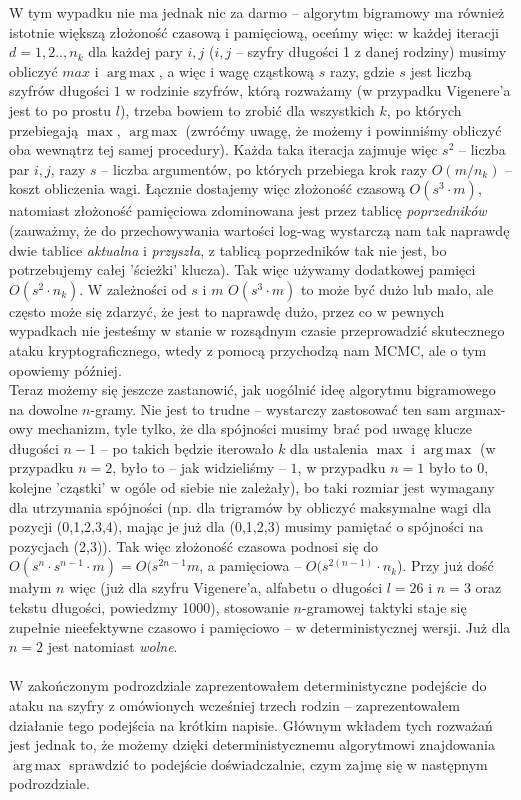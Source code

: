\documentclass[a4paper]{article}
\DeclareMathOperator*{\argmax}{arg\,max}
\begin{document}
W tym wypadku nie ma jednak nic za darmo – algorytm bigramowy ma również istotnie większą złożoność czasową i pamięciową, oceńmy więc: w każdej iteracji $d=1,2.., n_k$ dla każdej pary $i,j$ ($i,j$ – szyfry długości 1 z danej rodziny) musimy obliczyć $max$ i $\argmax$, a więc i wagę cząstkową $s$ razy, gdzie $s$ jest liczbą szyfrów długości $1$ w  rodzinie szyfrów, którą rozważamy (w przypadku Vigenere'a jest to po prostu $l$), trzeba bowiem to zrobić dla wszystkich $k$, po których przebiegają $\max$, $\argmax$ (zwróćmy uwagę, że możemy i powinniśmy obliczyć oba wewnątrz tej samej procedury). Każda taka iteracja zajmuje więc $s^2$ – liczba par $i,j$, razy $s$ – liczba argumentów, po których przebiega krok razy $O(m/n_k)$ – koszt obliczenia wagi. Łącznie dostajemy więc złożoność czasową $O(s^3 \cdot m)$, natomiast złożoność pamięciowa zdominowana jest przez tablicę \textit{poprzedników} (zauważmy, że do przechowywania wartości log-wag wystarczą nam tak naprawdę dwie tablice \textit{aktualna} i \textit{przyszła}, z tablicą poprzedników tak nie jest, bo potrzebujemy całej 'ścieżki' klucza). Tak więc używamy dodatkowej pamięci $O(s^2 \cdot n_k)$. W zależności od $s$ i $m$ $O(s^3 \cdot m)$ to może być dużo lub mało, ale często może się zdarzyć, że jest to naprawdę dużo, przez co w pewnych wypadkach nie jesteśmy w stanie w rozsądnym czasie przeprowadzić skutecznego ataku kryptograficznego, wtedy z pomocą przychodzą nam MCMC, ale o tym opowiemy później.\\
Teraz możemy się jeszcze zastanowić, jak uogólnić ideę algorytmu bigramowego na dowolne $n$-gramy. Nie jest to trudne – wystarczy zastosować ten sam argmax-owy mechanizm, tyle tylko, że dla spójności musimy brać pod uwagę klucze długości $n-1$ – po takich będzie iterowało $k$ dla ustalenia $\max$ i $\argmax$ (w przypadku $n=2$, było to – jak widzieliśmy – $1$, w przypadku $n=1$ było to $0$, kolejne 'cząstki' w ogóle od siebie nie zależały), bo taki rozmiar jest wymagany dla utrzymania spójności (np. dla trigramów by obliczyć maksymalne wagi dla pozycji (0,1,2,3,4), mając je już dla (0,1,2,3) musimy pamiętać o spójności na pozycjach (2,3)). Tak więc złożoność czasowa podnosi się do $O(s^n \cdot s^{n-1} \cdot m) = O(s^{2n-1}m$, a pamięciowa – $O(s^{2(n-1)} \cdot n_k$). Przy już dość małym $n$ więc (już dla szyfru Vigenere'a, alfabetu o długości $l=26$ i $n=3$ oraz tekstu długości, powiedzmy 1000), stosowanie $n$-gramowej taktyki staje się zupełnie nieefektywne czasowo i pamięciowo – w deterministycznej wersji. Już dla $n=2$ jest natomiast \textit{wolne}.\\\\
W zakończonym podrozdziale zaprezentowałem deterministyczne podejście do ataku na szyfry z omówionych wcześniej trzech rodzin – zaprezentowałem działanie tego podejścia na krótkim napisie. Głównym wkładem tych rozważań jest jednak to, że możemy dzięki deterministycznemu algorytmowi znajdowania $\argmax$ sprawdzić to podejście doświadczalnie, czym zajmę się w następnym podrozdziale.\\
\end{document}
